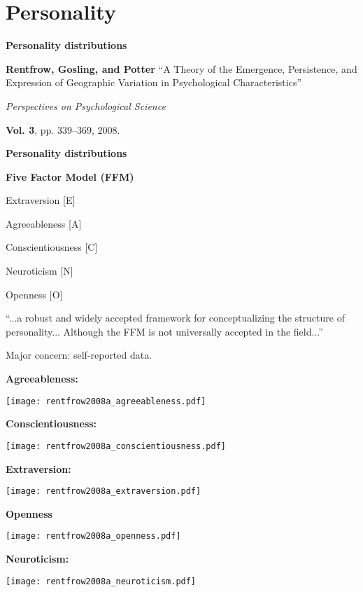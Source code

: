 \section{Personality}

  \textbf{Personality distributions}

  \textbf{Rentfrow, Gosling, and Potter\cite{rentfrow2008a}}
    ``A Theory of the Emergence, Persistence, and Expression of Geographic Variation in  Psychological Characteristics''

    \smallskip

    \textit{Perspectives on Psychological Science}

    \smallskip

    \textbf{Vol. 3}, pp. 339--369, 2008.
  


  \textbf{Personality distributions}

  \textbf{Five Factor Model (FFM)}
    
     
      Extraversion [E]
     
      Agreeableness [A]
     
      Conscientiousness [C]
     
      Neuroticism [N]
     
      Openness [O]
    

    \bigskip
    
    {
      ``...a robust and widely accepted framework for 
      conceptualizing the structure of personality...
      Although the FFM is not universally accepted in the field...''\cite{rentfrow2008a}
    }
    
    \bigskip

    {
      \alert{Major concern:} self-reported data.
    }
  


  \textbf{Agreeableness:}

  \texttt{[image: rentfrow2008a\_agreeableness.pdf]}


  \textbf{Conscientiousness:}

  \texttt{[image: rentfrow2008a\_conscientiousness.pdf]}


  \textbf{Extraversion:}

  \texttt{[image: rentfrow2008a\_extraversion.pdf]}


  \textbf{Openness}

  \texttt{[image: rentfrow2008a\_openness.pdf]}


  \textbf{Neuroticism:}

  \texttt{[image: rentfrow2008a\_neuroticism.pdf]}

